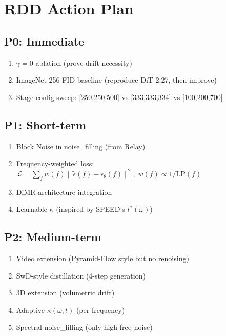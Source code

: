 \documentclass[11pt, a4paper]{article}
\begin{document}
\newpage
\section{RDD Action Plan}

\subsection{P0: Immediate}
\begin{enumerate}
    \item $\gamma=0$ ablation (prove drift necessity)
    \item ImageNet 256 FID baseline (reproduce DiT 2.27, then improve)
    \item Stage config sweep: [250,250,500] vs [333,333,334] vs [100,200,700]
\end{enumerate}

\subsection{P1: Short-term}
\begin{enumerate}
    \item Block Noise in noise\_filling (from Relay)
    \item Frequency-weighted loss: $\mathcal{L} = \sum_f w(f)\|\tilde{\epsilon}(f)-\epsilon_\theta(f)\|^2,\; w(f) \propto 1/\mathrm{LP}(f)$
    \item DiMR architecture integration
    \item Learnable $\kappa$ (inspired by SPEED's $t^*(\omega)$)
\end{enumerate}

\subsection{P2: Medium-term}
\begin{enumerate}
    \item Video extension (Pyramid-Flow style but no renoising)
    \item SwD-style distillation (4-step generation)
    \item 3D extension (volumetric drift)
    \item Adaptive $\kappa(\omega, t)$ (per-frequency)
    \item Spectral noise\_filling (only high-freq noise)
\end{enumerate}
\end{document}

